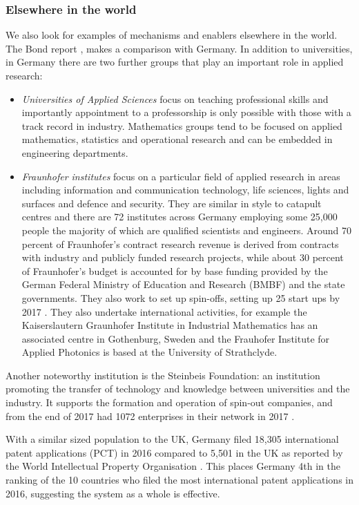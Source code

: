 \documentclass[11pt]{article} %
\begin{document}
	\subsubsection{Elsewhere in the world }	
	
	We also look for examples of mechanisms and enablers  elsewhere in the world. The Bond report \cite{Bond}, makes a comparison with Germany.   In addition to universities, in Germany there are two further groups that play an important role in applied research:
	\begin{itemize}
		\item \textit{Universities of Applied Sciences} focus on teaching professional skills and importantly appointment to a professorship is only possible with those with a track record in industry. Mathematics groups tend to be focused on applied mathematics, statistics and operational research and can be embedded in engineering departments. 
		\item \textit{Fraunhofer institutes} focus on a particular field of applied research in areas including information and communication technology, life sciences, lights and surfaces and defence and security. They are similar in style to catapult centres and there are 72 institutes across Germany employing some 25,000 people the majority of which are qualified scientists and engineers. Around 70 percent of Fraunhofer’s contract research revenue is derived from contracts with industry and publicly funded research projects, while about	30 percent of Fraunhofer’s budget is accounted for by
		base funding provided by the German Federal Ministry of	Education and Research (BMBF) and the state governments. They also work to set up spin-offs, setting up 25 start ups by 2017 \cite{Thum2017}. They also undertake international activities, for example the Kaiserslautern Graunhofer Institute in Industrial Mathematics has an associated centre in Gothenburg, Sweden and the Frauhofer Institute for Applied Photonics is based at the University of Strathclyde. 
	\end{itemize}

	Another noteworthy institution is the Steinbeis Foundation: an institution promoting the transfer of technology and knowledge between universities and the industry. It supports the formation and operation of spin-out companies, and from the end of 2017 had 1072 enterprises in their network in 2017 \cite{Steinbeis}.
	
	With a similar sized population to the UK, Germany filed 18,305 international patent applications (PCT) in 2016 compared to 5,501 in the UK as reported by the World Intellectual Property Organisation \cite{WIPO}. This places Germany 4th in the ranking of the 10 countries who filed the most international patent applications in 2016, suggesting the system as a whole is effective. 
		
\end{document}
